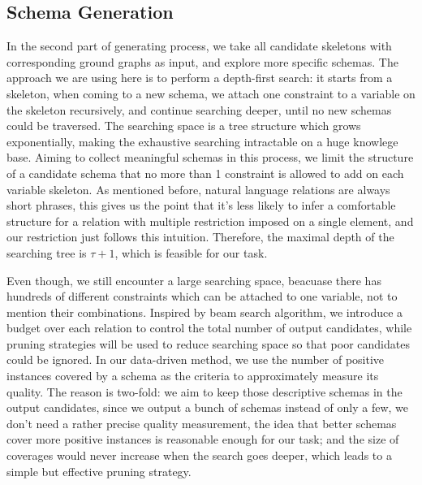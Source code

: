 \subsection{Schema Generation}
In the second part of generating process, we take all candidate 
skeletons with corresponding ground graphs as input, and explore
more specific schemas.
The approach we are using here is to perform a depth-first search:
it starts from a skeleton, when coming to a new schema, we attach 
one constraint to a variable on the skeleton recursively, and 
continue searching deeper, until no new schemas could be traversed.
The searching space is a tree structure which grows exponentially,
making the exhaustive searching intractable on a huge knowlege base.
Aiming to collect meaningful schemas in this process, we limit the 
structure of a candidate schema that no more than 1 constraint
is allowed to add on each variable skeleton.
As mentioned before, natural language relations are always short
phrases, this gives us the point that it's less likely to infer
a comfortable structure for a relation with multiple restriction 
imposed on a single element, and our restriction just follows 
this intuition.
Therefore, the maximal depth of the searching tree is $\tau+1$,
which is feasible for our task.

Even though, we still encounter a large searching space, beacuase
there has hundreds of different constraints which can be attached 
to one variable, not to mention their combinations.
Inspired by beam search algorithm, we introduce a budget over each
relation to control the total number of output candidates, while 
pruning strategies will be used to reduce searching space so that 
poor candidates could be ignored.
In our data-driven method, we use the number of positive instances 
covered by a schema as the criteria to approximately measure its
quality.
The reason is two-fold: we aim to keep those descriptive schemas in 
the output candidates, since we output a bunch of schemas instead
of only a few, we don't need a rather precise quality measurement,
the idea that better schemas cover more positive instances is
reasonable enough for our task; 
and the size of coverages would never increase when the search goes
deeper, which leads to a simple but effective pruning strategy.

